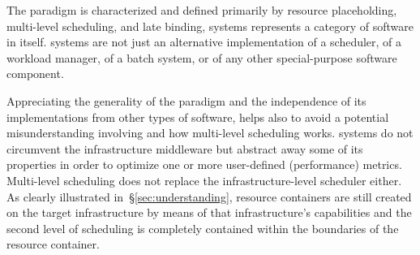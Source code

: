 \documentclass{sig-alternate}
\begin{document}
 


  

The \pilot paradigm is characterized and defined primarily by resource
placeholding, multi-level scheduling, and late binding, \pilot systems
represents a category of software in itself. \pilot systems are not just an
alternative implementation of a scheduler, of a workload manager, of a batch
system, or of any other special-purpose software component. 


Appreciating the generality of the \pilot paradigm and the independence of its
implementations from other types of software, helps also to avoid a potential
misunderstanding involving \pilots and how multi-level scheduling works. \pilot
systems do not circumvent the infrastructure middleware but abstract away some
of its properties in order to optimize one or more user-defined (performance)
metrics.  Multi-level scheduling does not replace the infrastructure-level
scheduler either. As clearly illustrated in~\S\ref{sec:understanding}, resource
containers are still created on the target infrastructure by means of that
infrastructure's capabilities and the second level of scheduling is completely
contained within the boundaries of the resource container.
\end{document}
